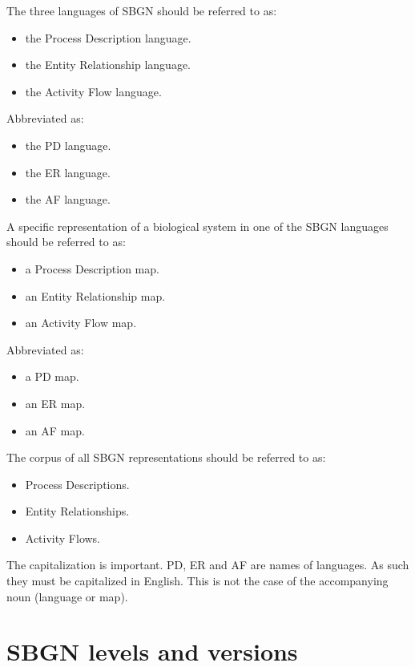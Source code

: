 The three languages of SBGN should be referred to as:
\begin{itemize}[noitemsep, nolistsep]
\item the Process Description language.
\item the Entity Relationship language.
\item the Activity Flow language.
\end{itemize}

Abbreviated as:
\begin{itemize}[noitemsep, nolistsep]
\item the PD language.
\item the ER language.
\item the AF language.
\end{itemize}

A specific representation of a biological system in one of the SBGN languages should be referred to as:
\begin{itemize}[noitemsep, nolistsep]
\item a Process Description map.
\item an Entity Relationship map.
\item an Activity Flow map.
\end{itemize}

Abbreviated as:
\begin{itemize}[noitemsep, nolistsep]
\item a PD map.
\item an ER map.
\item an AF map.
\end{itemize}

The corpus of all SBGN representations should be referred to as:
\begin{itemize}[noitemsep, nolistsep]
\item Process Descriptions.
\item Entity Relationships.
\item Activity Flows.
\end{itemize}

 The capitalization is important. PD, ER and AF are names of languages. As such they must be capitalized in English. This is not the case of the accompanying noun (language or map).

\section{SBGN levels and versions}
\label{sec:sbgn-levels}

